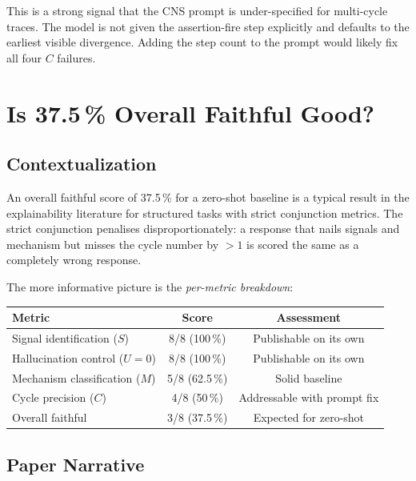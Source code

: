 \documentclass[11pt,a4paper]{article}
\begin{document}
This is a strong signal that the CNS prompt is under-specified for multi-cycle
traces. The model is not given the assertion-fire step explicitly and defaults
to the earliest visible divergence. Adding the step count to the prompt would
likely fix all four $C$ failures.

\section{Is 37.5\,\% Overall Faithful Good?}

\subsection{Contextualization}

An overall faithful score of 37.5\,\% for a zero-shot baseline is a typical
result in the explainability literature for structured tasks with strict
conjunction metrics. The strict conjunction penalises disproportionately: a
response that nails signals and mechanism but misses the cycle number by
$>1$ is scored the same as a completely wrong response.

The more informative picture is the \emph{per-metric breakdown}:

\begin{center}
\begin{tabular}{lcc}
\toprule
\textbf{Metric} & \textbf{Score} & \textbf{Assessment} \\
\midrule
Signal identification ($S$) & 8/8 (100\,\%) & Publishable on its own \\
Hallucination control ($U=0$) & 8/8 (100\,\%) & Publishable on its own \\
Mechanism classification ($M$) & 5/8 (62.5\,\%) & Solid baseline \\
Cycle precision ($C$) & 4/8 (50\,\%) & Addressable with prompt fix \\
Overall faithful & 3/8 (37.5\,\%) & Expected for zero-shot \\
\bottomrule
\end{tabular}
\end{center}

\subsection{Paper Narrative}
\end{document}

